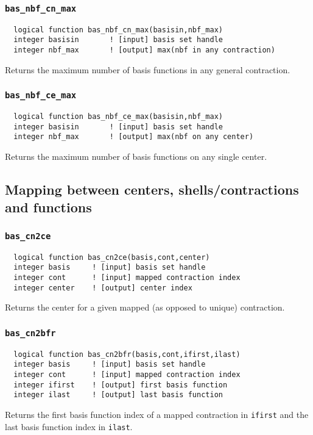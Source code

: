 \subsubsection{{\tt bas\_nbf\_cn\_max}}
\begin{verbatim}
  logical function bas_nbf_cn_max(basisin,nbf_max)
  integer basisin       ! [input] basis set handle
  integer nbf_max       ! [output] max(nbf in any contraction)
\end{verbatim}
Returns the maximum number of basis functions in any general contraction.

\subsubsection{{\tt bas\_nbf\_ce\_max}}
\begin{verbatim}
  logical function bas_nbf_ce_max(basisin,nbf_max)
  integer basisin       ! [input] basis set handle
  integer nbf_max       ! [output] max(nbf on any center)
\end{verbatim}
Returns the maximum number of basis functions on any single center.

\subsection{Mapping between centers, shells/contractions and functions}

\subsubsection{{\tt bas\_cn2ce}}
\begin{verbatim}
  logical function bas_cn2ce(basis,cont,center)
  integer basis     ! [input] basis set handle
  integer cont      ! [input] mapped contraction index
  integer center    ! [output] center index
\end{verbatim}
Returns the center for a given mapped (as opposed to unique)
contraction.

\subsubsection{{\tt bas\_cn2bfr}}
\begin{verbatim}
  logical function bas_cn2bfr(basis,cont,ifirst,ilast)
  integer basis     ! [input] basis set handle
  integer cont      ! [input] mapped contraction index
  integer ifirst    ! [output] first basis function
  integer ilast     ! [output] last basis function     
\end{verbatim}
Returns the first basis function index of a mapped contraction in
{\tt ifirst} and the last basis function index in {\tt ilast}.

